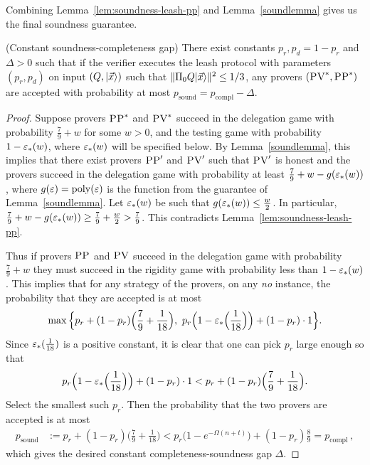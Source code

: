 \noindent Combining Lemma~\ref{lem:soundness-leash-pp} and Lemma~\ref{soundlemma} gives us the final soundness guarantee.

\begin{lemma}\label{lem:leash-soundness} (Constant soundness-completeness gap)
There exist constants $p_r,p_d=1-p_r$ and $\Delta>0$ such that if the verifier executes the leash protocol with parameters $(p_r,p_d)$ on input $(Q,|\vec{x}\rangle)$ such that $\|\Pi_0 Q|\vec{x}\rangle\|^2 \leq 1/3$, any provers $(\textsc{PV}^*,\textsc{PP}^*)$ are accepted with probability at most \mbox{$p_{\mathrm{sound}}=p_{\mathrm{compl}}-\Delta$}.  
\end{lemma}

\begin{proof}
Suppose provers $\textsc{PP}^*$ and $\textsc{PV}^*$ succeed in the delegation game with probability $\frac79+w$ for some $w>0$, and the testing game with probability $1-\varepsilon_*(w)$, where $\varepsilon_*(w)$ will be specified below. By Lemma~\ref{soundlemma}, this implies that there exist provers $\textsc{PP}'$ and $\textsc{PV}'$ such that $\textsc{PV}'$ is honest and the provers succeed in the delegation game with probability at least $\frac79+w-g(\varepsilon_*(w))$, where $g(\varepsilon) = \operatorname{poly}(\varepsilon)$ is the function from the guarantee of Lemma~\ref{soundlemma}. Let $\varepsilon_*(w)$ be such that $g(\varepsilon_*(w)) \leq \frac{w}{2}$. In particular, $\frac79+w-g(\varepsilon_*(w)) \geq \frac79+\frac{w}{2}>\frac79$. This contradicts Lemma~\ref{lem:soundness-leash-pp}. 

Thus if provers $\textsc{PP}$ and $\textsc{PV}$ succeed in the delegation game with probability $\frac79+w$ they must succeed in the rigidity game with probability less than $1-\varepsilon_*(w)$. 
This implies that for any strategy of the provers, on any \textit{no} instance, the probability that they are accepted is at most
\begin{equation}
\max\Big\{p_r+(1-p_r)\Big(\frac79+\frac{1}{18}\Big),\,\, p_r\Big(1-\varepsilon_*\Big(\frac{1}{18}\Big)\Big)+(1-p_r)\cdot 1\Big\}.
\end{equation}
Since $\varepsilon_*(\frac{1}{18})$ is a positive constant, it is clear that one can pick $p_r$ large enough so that 
\begin{equation}
p_r\Big(1-\varepsilon_*\Big(\frac{1}{18}\Big)\Big)+(1-p_r)\cdot 1 < p_r+(1-p_r)\Big(\frac79+\frac{1}{18}\Big).
\end{equation}
Select the smallest such $p_r$. Then the probability that the two provers are accepted is at most 
\begin{align*}
p_{\mathrm{sound}} &:= p_r+(1-p_r)\Big(\frac79+\frac{1}{18}\Big)
< p_r\big(1-e^{-\Omega(n+t)}\big)+(1-p_r)\frac89 
= p_{\mathrm{compl}} \,,
\end{align*}
which gives the desired constant completeness-soundness gap $\Delta$.
\end{proof}

